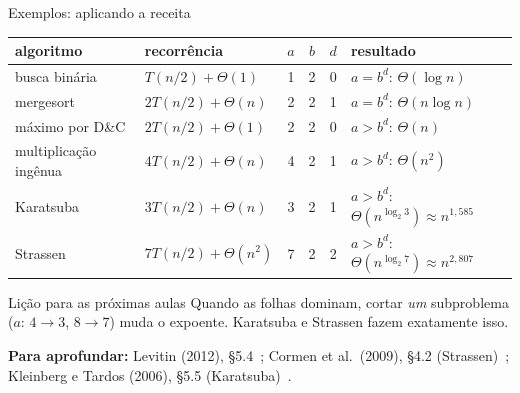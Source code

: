 \documentclass[aspectratio=169,xcolor=table]{beamer}
\newcommand{\fonte}[1]{%
  \vfill
  {\tiny\color{gray!55!black}\textbf{Para aprofundar:} #1\par}%
}
\begin{document}
\begin{frame}{Exemplos: aplicando a receita}
  \begin{center}
  \scriptsize
  \begin{tabular}{llcccl}
    \toprule
    algoritmo & recorrência & $a$ & $b$ & $d$ & resultado \\
    \midrule
    busca binária            & $T(n/2)+\Theta(1)$   & 1 & 2 & 0 & $a=b^d$: $\Theta(\log n)$ \\
    mergesort                & $2T(n/2)+\Theta(n)$  & 2 & 2 & 1 & $a=b^d$: $\Theta(n\log n)$ \\
    máximo por D\&C          & $2T(n/2)+\Theta(1)$  & 2 & 2 & 0 & $a>b^d$: $\Theta(n)$ \\
    multiplicação ingênua    & $4T(n/2)+\Theta(n)$  & 4 & 2 & 1 & $a>b^d$: $\Theta(n^2)$ \\
    \rowcolor{orange!15}
    Karatsuba                & $3T(n/2)+\Theta(n)$  & 3 & 2 & 1 & $a>b^d$: $\Theta(n^{\log_2 3})\approx n^{1{,}585}$ \\
    \rowcolor{orange!15}
    Strassen                 & $7T(n/2)+\Theta(n^2)$& 7 & 2 & 2 & $a>b^d$: $\Theta(n^{\log_2 7})\approx n^{2{,}807}$ \\
    \bottomrule
  \end{tabular}
  \end{center}
  \begin{alertblock}{Lição para as próximas aulas}
    \scriptsize Quando as folhas dominam, cortar \emph{um} subproblema ($a$: $4\to 3$, $8\to 7$)
    muda o expoente. Karatsuba e Strassen fazem exatamente isso.
  \end{alertblock}
  \fonte{Levitin (2012), \S 5.4~\cite{levitin2012introduction};
    Cormen et al.\ (2009), \S 4.2 (Strassen)~\cite{cormen2009introduction};
    Kleinberg e Tardos (2006), \S 5.5 (Karatsuba)~\cite{kleinberg2006algorithm}.}
\end{frame}
\end{document}
